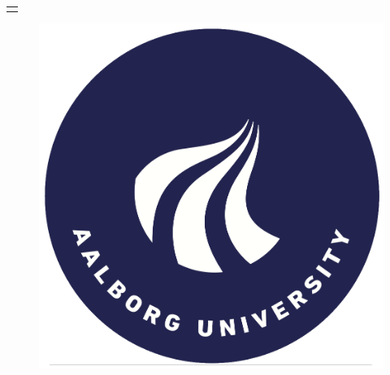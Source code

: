 \begin{titlepage}
{{\begin{tabular}{@{}p{\paperwidth}@{}}
    \centerline{
    \begin{minipage}{0.9\textwidth}
        \bigskip
        \centering
        {\Large 15th April, 2021}
        \smallskip
    \end{minipage}}
			
  \end{tabular}}}
  \vfill
  \begin{figure}[!b]
	\centering
    \includegraphics[width=0.2\paperwidth]{Figures/frontpage/AAUcircle.png}
  \end{figure}

\end{titlepage}
\clearpage

\restoregeometry %